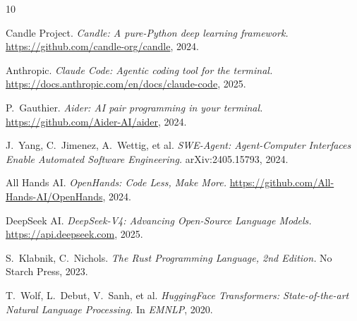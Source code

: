 \documentclass[11pt]{article}
\begin{document}

\begin{thebibliography}{10}

Candle Project. \textit{Candle: A pure-Python deep learning framework.} \url{https://github.com/candle-org/candle}, 2024.

Anthropic. \textit{Claude Code: Agentic coding tool for the terminal.} \url{https://docs.anthropic.com/en/docs/claude-code}, 2025.

P.~Gauthier. \textit{Aider: AI pair programming in your terminal.} \url{https://github.com/Aider-AI/aider}, 2024.

J.~Yang, C.~Jimenez, A.~Wettig, et al. \textit{SWE-Agent: Agent-Computer Interfaces Enable Automated Software Engineering.} arXiv:2405.15793, 2024.

All Hands AI. \textit{OpenHands: Code Less, Make More.} \url{https://github.com/All-Hands-AI/OpenHands}, 2024.

DeepSeek AI. \textit{DeepSeek-V4: Advancing Open-Source Language Models.} \url{https://api.deepseek.com}, 2025.

S.~Klabnik, C.~Nichols. \textit{The Rust Programming Language, 2nd Edition.} No Starch Press, 2023.

T.~Wolf, L.~Debut, V.~Sanh, et al. \textit{HuggingFace Transformers: State-of-the-art Natural Language Processing.} In \textit{EMNLP}, 2020.

\end{thebibliography}
\end{document}
